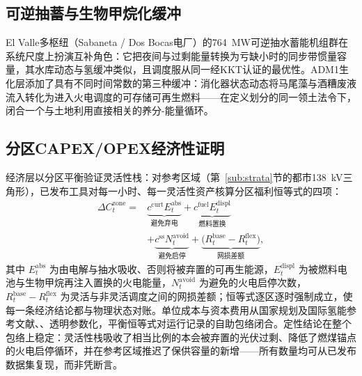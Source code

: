 \subsection{可逆抽蓄与生物甲烷化缓冲}
\label{sub:phes}

El Valle多枢纽（Sabaneta / Dos Bocas电厂）的764~MW可逆抽水蓄能机组群在系统尺度上扮演互补角色：它把夜间与过剩能量转换为亏缺小时的同步带惯量容量，其水库动态与氢缓冲类似，且调度服从同一经KKT认证的最优性。ADM1生化层添加了具有不同时间常数的第三种缓冲：消化器状态动态将马尾藻与酒糟废液流入转化为进入火电调度的可存储可再生燃料——在定义划分的同一领土法令下，闭合一个与土地利用直接相关的养分-能量循环。

\subsection{分区CAPEX/OPEX经济性证明}
\label{sub:zonal}

经济层以分区平衡验证灵活性栈：对参考区域（第~\ref{sub:strata}节的都市138~kV三角形），已发布工具对每一小时、每一灵活性资产核算分区福利恒等式的四项：
\begin{equation}
\begin{aligned}
\Delta C^{\mathrm{zone}}_t = {}& \underbrace{c^{\mathrm{curt}} E^{\mathrm{abs}}_t}_{\text{避免弃电}} + \underbrace{c^{\mathrm{fuel}} E^{\mathrm{displ}}_t}_{\text{燃料置换}} \\
& + \underbrace{c^{\mathrm{ss}} N^{\mathrm{avoid}}_t}_{\text{避免启停}} + \underbrace{\big(R^{\mathrm{base}}_t - R^{\mathrm{flex}}_t\big)}_{\text{网损差额}},
\end{aligned}
\label{eq:zonal}
\end{equation}
其中 $E^{\mathrm{abs}}_t$ 为由电解与抽水吸收、否则将被弃置的可再生能源，$E^{\mathrm{displ}}_t$ 为被燃料电池与生物甲烷再注入置换的火电能量，$N^{\mathrm{avoid}}_t$ 为避免的火电启停次数，$R^{\mathrm{base}}_t - R^{\mathrm{flex}}_t$ 为灵活与非灵活调度之间的网损差额；恒等式逐区逐时强制成立，使每一条经济结论都与物理状态对账。单位成本与资本费用从国家规划及国际氢能参考文献\cite{cne2022}、\cite{irena2020}、\cite{iea2023}透明参数化，平衡恒等式对运行记录的自助包络闭合。定性结论在整个包络上稳定：灵活性栈吸收了相当比例的本会被弃置的光伏过剩、降低了燃煤锚点的火电启停循环，并在参考区域推迟了保供容量的新增——所有数量均可从已发布数据集复现，而非凭断言。
